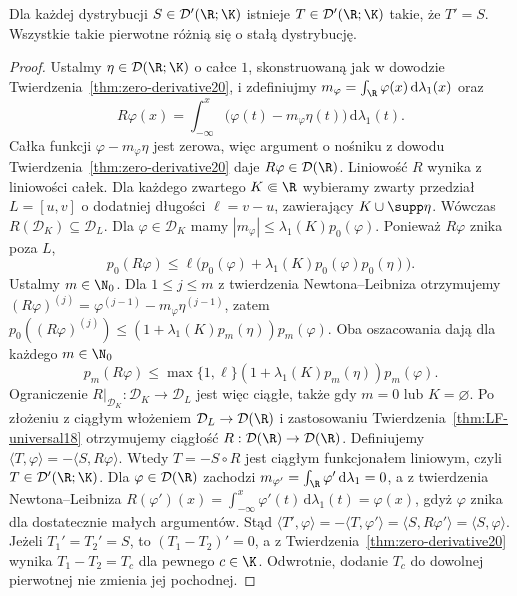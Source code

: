 \begin{twierdzenie}
\label{thm:primitive20}
Dla każdej dystrybucji $S\in\mathcal D'(\R;\K)$
istnieje $T\in\mathcal D'(\R;\K)$ takie, że $T'=S$.
Wszystkie takie pierwotne różnią się o stałą dystrybucję.
\end{twierdzenie}
\begin{proof}
Ustalmy $\eta\in\mathcal D(\R;\K)$ o całce $1$,
skonstruowaną jak w dowodzie
Twierdzenia~\ref{thm:zero-derivative20}, i
zdefiniujmy $m_\varphi=\int_\R\varphi(x)\,\mathrm d\lambda_1(x)$
oraz
\[
 R\varphi(x)=\int_{-\infty}^x
 \bigl(\varphi(t)-m_\varphi\eta(t)\bigr)\,\mathrm d\lambda_1(t).
\]
Całka funkcji $\varphi-m_\varphi\eta$ jest zerowa,
więc argument o nośniku z dowodu
Twierdzenia~\ref{thm:zero-derivative20} daje
$R\varphi\in\mathcal D(\R)$.
Liniowość $R$ wynika z liniowości całek.
Dla każdego zwartego $K\Subset\R$ wybieramy zwarty przedział
$L=[u,v]$ o dodatniej długości $\ell=v-u$, zawierający
$K\cup\supp\eta$. Wówczas $R(\mathcal D_K)\subseteq\mathcal D_L$.
Dla $\varphi\in\mathcal D_K$ mamy
$|m_\varphi|\le\lambda_1(K)p_0(\varphi)$.
Ponieważ $R\varphi$ znika poza $L$,
\[
p_0(R\varphi)\le\ell\bigl(p_0(\varphi)
+\lambda_1(K)p_0(\varphi)p_0(\eta)\bigr).
\]
Ustalmy $m\in\N_0$. Dla $1\le j\le m$ z twierdzenia Newtona--Leibniza
otrzymujemy $(R\varphi)^{(j)}=\varphi^{(j-1)}
-m_\varphi\eta^{(j-1)}$, zatem
$p_0((R\varphi)^{(j)})\le
(1+\lambda_1(K)p_m(\eta))p_m(\varphi)$.
Oba oszacowania dają dla każdego $m\in\N_0$
\[
p_m(R\varphi)\le
\max\{1,\ell\}(1+\lambda_1(K)p_m(\eta))p_m(\varphi).
\]
Ograniczenie $R|_{\mathcal D_K}:\mathcal D_K\to\mathcal D_L$
jest więc ciągłe, także gdy $m=0$ lub $K=\varnothing$.
Po złożeniu z ciągłym włożeniem $\mathcal D_L\to\mathcal D(\R)$
i zastosowaniu Twierdzenia~\ref{thm:LF-universal18}
otrzymujemy ciągłość $R:\mathcal D(\R)\to\mathcal D(\R)$.
Definiujemy
$\langle T,\varphi\rangle=-\langle S,R\varphi\rangle$.
Wtedy $T=-S\circ R$ jest ciągłym funkcjonałem liniowym,
czyli $T\in\mathcal D'(\R;\K)$.
Dla $\varphi\in\mathcal D(\R)$ zachodzi
$m_{\varphi'}=\int_\R\varphi'\,\mathrm d\lambda_1=0$,
a z twierdzenia Newtona--Leibniza
$R(\varphi')(x)=\int_{-\infty}^x\varphi'(t)\,
\mathrm d\lambda_1(t)=\varphi(x)$, gdyż $\varphi$ znika
dla dostatecznie małych argumentów.
Stąd
$\langle T',\varphi\rangle=-\langle T,\varphi'\rangle
=\langle S,R\varphi'\rangle=\langle S,\varphi\rangle$.
Jeżeli $T_1'=T_2'=S$, to $(T_1-T_2)'=0$, a z
Twierdzenia~\ref{thm:zero-derivative20} wynika $T_1-T_2=T_c$
dla pewnego $c\in\K$. Odwrotnie, dodanie $T_c$ do
dowolnej pierwotnej nie zmienia jej pochodnej.
\end{proof}

